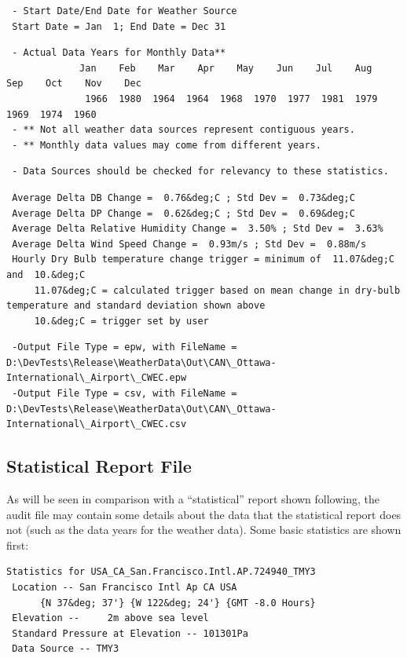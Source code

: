 \begin{lstlisting}
 - Start Date/End Date for Weather Source
 Start Date = Jan  1; End Date = Dec 31
\end{lstlisting}

\begin{lstlisting}
 - Actual Data Years for Monthly Data**
             Jan    Feb    Mar    Apr    May    Jun    Jul    Aug    Sep    Oct    Nov    Dec
              1966  1980  1964  1964  1968  1970  1977  1981  1979  1969  1974  1960
 - ** Not all weather data sources represent contiguous years.
 - ** Monthly data values may come from different years.
\end{lstlisting}

\begin{lstlisting}
 - Data Sources should be checked for relevancy to these statistics.
\end{lstlisting}

\begin{lstlisting}
 Average Delta DB Change =  0.76&deg;C ; Std Dev =  0.73&deg;C
 Average Delta DP Change =  0.62&deg;C ; Std Dev =  0.69&deg;C
 Average Delta Relative Humidity Change =  3.50% ; Std Dev =  3.63%
 Average Delta Wind Speed Change =  0.93m/s ; Std Dev =  0.88m/s
 Hourly Dry Bulb temperature change trigger = minimum of  11.07&deg;C  and  10.&deg;C
     11.07&deg;C = calculated trigger based on mean change in dry-bulb temperature and standard deviation shown above
     10.&deg;C = trigger set by user
\end{lstlisting}

\begin{lstlisting}
 -Output File Type = epw, with FileName = D:\DevTests\Release\WeatherData\Out\CAN\_Ottawa-International\_Airport\_CWEC.epw
 -Output File Type = csv, with FileName = D:\DevTests\Release\WeatherData\Out\CAN\_Ottawa-International\_Airport\_CWEC.csv
\end{lstlisting}

\subsection{Statistical Report File}\label{statistical-report-file}

As will be seen in comparison with a ``statistical'' report shown following, the audit file may contain some details about the data that the statistical report does not (such as the data years for the weather data). Some basic statistics are shown first:

\begin{lstlisting}
Statistics for USA_CA_San.Francisco.Intl.AP.724940_TMY3
 Location -- San Francisco Intl Ap CA USA
      {N 37&deg; 37'} {W 122&deg; 24'} {GMT -8.0 Hours}
 Elevation --     2m above sea level
 Standard Pressure at Elevation -- 101301Pa
 Data Source -- TMY3
\end{lstlisting}

